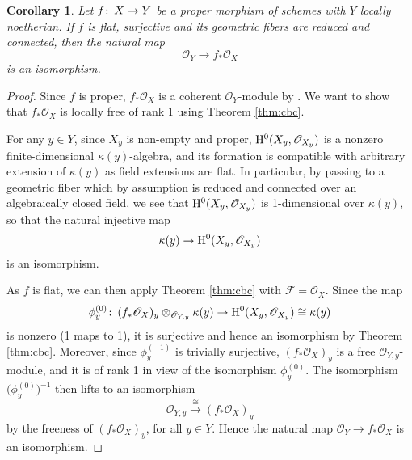 \documentclass{gtpart}
\newtheorem{cor}[thm]{Corollary}
\theoremstyle{definition}
\theoremstyle{remark}
\def\co{\colon\thinspace}
\newcommand{\CO}{{\mathscr{O}}}
\newcommand{\CF}{{\mathscr{F}}}
\newcommand{\ho}{{\rm H}}
\newcommand{\rf}{\kappa}
\newcommand{\f}{\phi}
\begin{document}
\begin{cor}
\label{cor:pushforward}
 Let $f \co X \to Y$ be a proper morphism of schemes with $Y$ locally noetherian.  
 If $f$ is flat, surjective and its geometric fibers are reduced and connected, then the natural map 
 \[
  \CO_Y \to f_* \CO_X 
 \]
 is an isomorphism.  
\end{cor}
\begin{proof}
 Since $f$ is proper, $f_* \CO_X$ is a coherent $\CO_Y$-module by \cite[3.2.1]{EGAIII}.  
 We want to show that $f_* \CO_X$ is locally free of rank 1 using Theorem \ref{thm:cbc}.  

 For any $y \in Y$, since $X_y$ is non-empty and proper, 
 $\ho^0(X_y,\CO_{X_y})$ is a nonzero finite-dimensional $\rf(y)$-algebra, 
 and its formation is compatible with arbitrary extension of $\rf(y)$ as field extensions are flat.  
 In particular, by passing to a geometric fiber which by assumption is reduced and connected over an algebraically closed field, 
 we see that $\ho^0(X_y,\CO_{X_y})$ is 1-dimensional over $\rf(y)$, 
 so that the natural injective map 
 \[
  \rf(y) \to \ho^0(X_y,\CO_{X_y}) 
 \]
 is an isomorphism.  

 As $f$ is flat, we can then apply Theorem \ref{thm:cbc} with $\CF = \CO_X$.  
 Since the map 
 \begin{equation}
 \label{phi0}
  \f^{(0)}_y \co (f_* \CO_X)_y \otimes_{\CO_{Y,y}} \rf(y) \to \ho^0(X_y,\CO_{X_y}) \cong \rf(y) 
 \end{equation}
 is nonzero (1 maps to 1), it is surjective and hence an isomorphism by Theorem \ref{thm:cbc}.  
 Moreover, since $\f^{(-1)}_y$ is trivially surjective, $(f_* \CO_X)_y$ is a free $\CO_{Y,y}$-module, 
 and it is of rank 1 in view of the isomorphism $\f^{(0)}_y$.  
 The isomorphism $\big( \f^{(0)}_y \big)^{-1}$ then lifts to an isomorphism 
 \[
  \CO_{Y,y} \stackrel{\cong}{\longrightarrow} (f_* \CO_X)_y 
 \]
 by the freeness of $(f_* \CO_X)_y$, for all $y \in Y$.  
 Hence the natural map $\CO_Y \to f_* \CO_X$ is an isomorphism.  
\end{proof}
\end{document}
